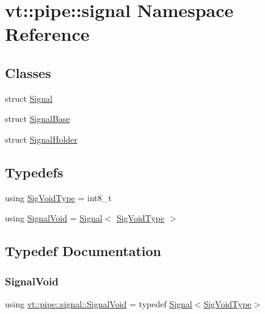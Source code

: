 \hypertarget{namespacevt_1_1pipe_1_1signal}{}\section{vt\+:\+:pipe\+:\+:signal Namespace Reference}
\label{namespacevt_1_1pipe_1_1signal}
\subsection*{Classes}
\begin{DoxyCompactItemize}
\item 
struct \hyperlink{structvt_1_1pipe_1_1signal_1_1_signal}{Signal}
\item 
struct \hyperlink{structvt_1_1pipe_1_1signal_1_1_signal_base}{Signal\+Base}
\item 
struct \hyperlink{structvt_1_1pipe_1_1signal_1_1_signal_holder}{Signal\+Holder}
\end{DoxyCompactItemize}
\subsection*{Typedefs}
\begin{DoxyCompactItemize}
\item 
using \hyperlink{namespacevt_1_1pipe_1_1signal_acbe257d1ae44f20fa9fd9b6ed3057caf}{Sig\+Void\+Type} = int8\+\_\+t
\item 
using \hyperlink{namespacevt_1_1pipe_1_1signal_ac80a6a95b9545fa65856842a88ac6087}{Signal\+Void} = \hyperlink{structvt_1_1pipe_1_1signal_1_1_signal}{Signal}$<$ \hyperlink{namespacevt_1_1pipe_1_1signal_acbe257d1ae44f20fa9fd9b6ed3057caf}{Sig\+Void\+Type} $>$
\end{DoxyCompactItemize}


\subsection{Typedef Documentation}
\mbox{\label{namespacevt_1_1pipe_1_1signal_ac80a6a95b9545fa65856842a88ac6087}} 
\subsubsection{\texorpdfstring{Signal\+Void}{SignalVoid}}
{\footnotesize\ttfamily using \hyperlink{namespacevt_1_1pipe_1_1signal_ac80a6a95b9545fa65856842a88ac6087}{vt\+::pipe\+::signal\+::\+Signal\+Void} = typedef \hyperlink{structvt_1_1pipe_1_1signal_1_1_signal}{Signal}$<$\hyperlink{namespacevt_1_1pipe_1_1signal_acbe257d1ae44f20fa9fd9b6ed3057caf}{Sig\+Void\+Type}$>$}

